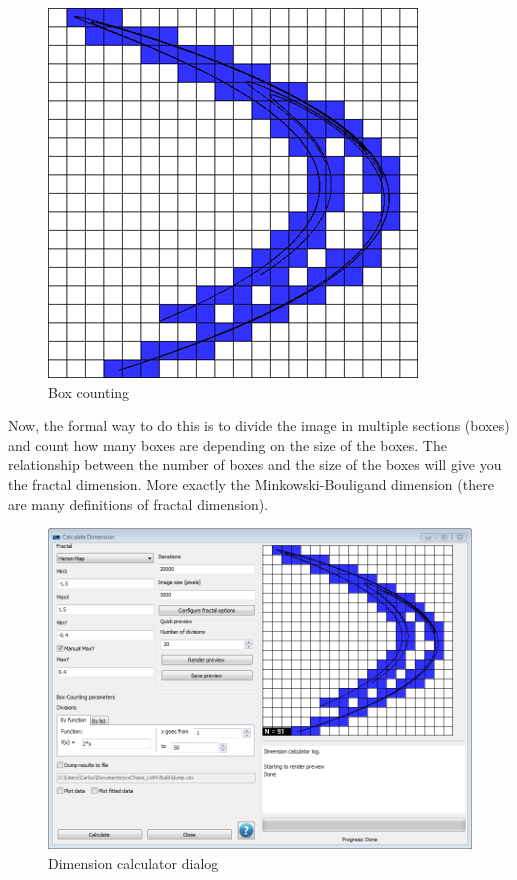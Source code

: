 \documentclass[oneside]{book}
\begin{document}
\begin{figure}[h!]
	\centering
	\includegraphics[scale=0.4]{img/dim.png}
	\caption{Box counting}
	\label{Dimension}
\end{figure}

Now, the formal way to do this is to divide the image in multiple sections (boxes) and count how many boxes are depending on the size of the boxes. The relationship between the number of boxes and the size of the boxes will give you the fractal dimension. More exactly the Minkowski-Bouligand dimension (there are many definitions of fractal dimension).

\begin{figure}[h!]
	\centering
	\includegraphics[scale=0.4]{img/sc9.png}
	\caption{Dimension calculator dialog}
	\label{Dim dialog}
\end{figure}
\end{document}
